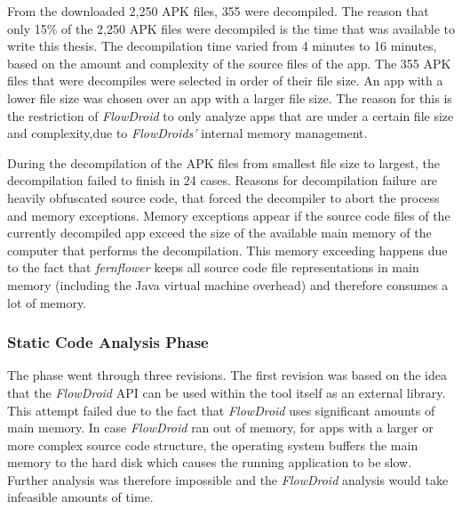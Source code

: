 From the downloaded 2,250 APK files, 355 were decompiled. 
The reason that only 15\% of the 2,250 APK files were decompiled is the time that was available to write this thesis.
The decompilation time varied from 4 minutes to 16 minutes, based on the amount and complexity of the source files of the app.
The 355 APK files that were decompiles were selected in order of their file size.
An app with a lower file size was chosen over an app with a larger file size.
The reason for this is the restriction of \textit{FlowDroid} to only analyze apps that are under a certain file size and complexity,due to \textit{FlowDroids'} internal memory management.

During the decompilation of the APK files from smallest file size to largest, the decompilation failed to finish in 24 cases.
Reasons for decompilation failure are heavily obfuscated source code, that forced the decompiler to abort the process and memory exceptions.
Memory exceptions appear if the source code files of the currently decompiled app exceed the size of the available main memory of the computer that performs the decompilation.
This memory exceeding happens due to the fact that \textit{fernflower} keeps all source code file representations in main memory (including the Java virtual machine overhead) and therefore consumes a lot of memory.

\subsubsection{Static Code Analysis Phase}

The \sca phase went through three revisions. 
The first revision was based on the idea that the \textit{FlowDroid} \acs{API} can be used within the \AIPRAT tool itself as an external library.
This attempt failed due to the fact that \textit{FlowDroid} uses significant amounts of main memory.
In case \textit{FlowDroid} ran out of memory, for apps with a larger or more complex source code structure, the operating system buffers the main memory to the hard disk which causes the running application to be slow.
Further analysis was therefore impossible and the \textit{FlowDroid} analysis would take infeasible amounts of time.

